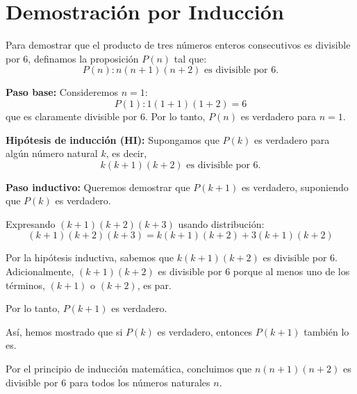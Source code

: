 \documentclass{article}
\begin{document}
\section*{Demostración por Inducción}

Para demostrar que el producto de tres números enteros consecutivos es divisible por 6, definamos la proposición \( P(n) \) tal que:
\[ P(n): n(n + 1)(n + 2) \text{ es divisible por 6.} \]

\textbf{Paso base:} Consideremos \( n = 1 \):
\[ P(1): 1(1 + 1)(1 + 2) = 6 \]
que es claramente divisible por 6. Por lo tanto, \( P(n) \) es verdadero para \( n = 1 \).

\textbf{Hipótesis de inducción (HI):} Supongamos que \( P(k) \) es verdadero para algún número natural \( k \), es decir, 
\[ k(k + 1)(k + 2) \text{ es divisible por 6.} \]

\textbf{Paso inductivo:} Queremos demostrar que \( P(k + 1) \) es verdadero, suponiendo que \( P(k) \) es verdadero.

Expresando \( (k+1)(k+2)(k+3) \) usando distribución:
\[ (k+1)(k+2)(k+3) = k(k+1)(k+2) + 3(k+1)(k+2) \]

Por la hipótesis inductiva, sabemos que \( k(k+1)(k+2) \) es divisible por 6. Adicionalmente, \( (k+1)(k+2) \) es divisible por 6 porque al menos uno de los términos, \( (k+1) \) o \( (k+2) \), es par.

Por lo tanto, \( P(k + 1) \) es verdadero.

Así, hemos mostrado que si \( P(k) \) es verdadero, entonces \( P(k+1) \) también lo es.

Por el principio de inducción matemática, concluimos que \( n(n+1)(n+2) \) es divisible por 6 para todos los números naturales \( n \).
\end{document}
